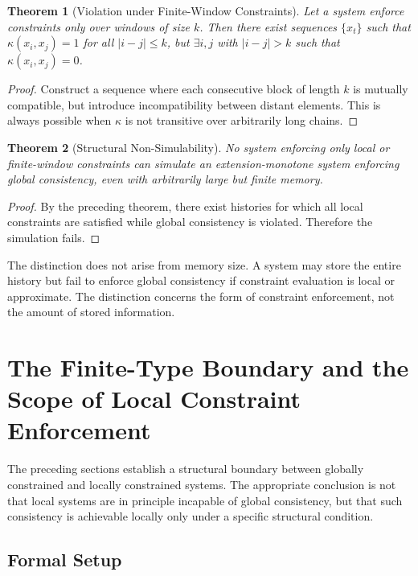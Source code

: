\documentclass[12pt, a4paper]{article}
\theoremstyle{plain}
\newtheorem{theorem}{Theorem}[section]
\theoremstyle{definition}
\theoremstyle{remark}
\begin{document}
\begin{theorem}[Violation under Finite-Window Constraints]
Let a system enforce constraints only over windows of size $k$. Then there exist sequences $\{x_t\}$ such that $\kappa(x_i, x_j) = 1$ for all $|i-j| \le k$, but $\exists i,j$ with $|i-j| > k$ such that $\kappa(x_i, x_j) = 0$.
\end{theorem}

\begin{proof}
Construct a sequence where each consecutive block of length $k$ is mutually compatible, but introduce incompatibility between distant elements. This is always possible when $\kappa$ is not transitive over arbitrarily long chains.
\end{proof}

\begin{theorem}[Structural Non-Simulability]
No system enforcing only local or finite-window constraints can simulate an extension-monotone system enforcing global consistency, even with arbitrarily large but finite memory.
\end{theorem}

\begin{proof}
By the preceding theorem, there exist histories for which all local constraints are satisfied while global consistency is violated. Therefore the simulation fails.
\end{proof}

The distinction does not arise from memory size. A system may store the entire history but fail to enforce global consistency if constraint evaluation is local or approximate. The distinction concerns the form of constraint enforcement, not the amount of stored information.

\section{The Finite-Type Boundary and the Scope of Local Constraint Enforcement}

The preceding sections establish a structural boundary between globally constrained and locally constrained systems. The appropriate conclusion is not that local systems are in principle incapable of global consistency, but that such consistency is achievable locally only under a specific structural condition.

\subsection{Formal Setup}
\end{document}
